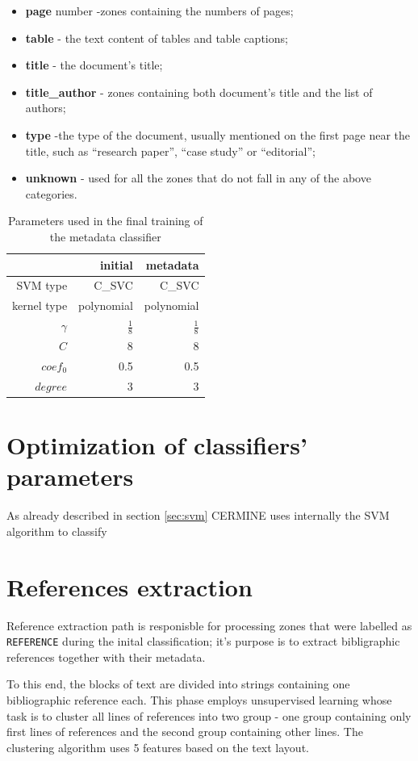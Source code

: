 \begin{itemize}
    \item \textbf{page} number -zones containing the numbers of pages;
    \item \textbf{table} - the text content of tables and table captions;
    \item \textbf{title} - the document's title;
    \item \textbf{title\_author} - zones containing both document's title and the list of authors;
    \item \textbf{type} -the type of the document, usually mentioned on the first page near the title, such as ``research paper'', ``case study'' or ``editorial'';
    \item \textbf{unknown} - used for all the zones that do not fall in any of the above categories.
\end{itemize}
\begin{table}
\centering
\begin{tabular}{@{}rrr@{}}
\toprule
& initial & metadata \\
\midrule
SVM type & C\_SVC & C\_SVC \\ 
kernel type & polynomial & polynomial \\
$\gamma$ & $\frac{1}{8}$ & $\frac{1}{8}$ \\ 
$C$ & 8 & 8 \\
$coef_0$ & 0.5 & 0.5 \\
$degree$ & 3 & 3 \\
\bottomrule
\end{tabular}
\caption{Parameters used in the final training of the metadata classifier}
\label{tab:metadata_classifier_parameters}
\end{table} 


\section{Optimization of classifiers' parameters}
\label{sec:svm_optimization}
As already described in section \ref{sec:svm} CERMINE uses internally the SVM algorithm to classify  
\section{References extraction}
Reference extraction path is responisble for processing zones that were labelled as \verb+REFERENCE+ during the inital classification; it's purpose is to extract bibligraphic references together with their metadata.

To this end, the blocks of text are divided into strings containing one bibliographic reference each. This phase employs unsupervised learning whose task is to cluster all lines of references into two group - one group containing only first lines of references and the second group containing other lines. The clustering algorithm uses 5 features based on the text layout.

